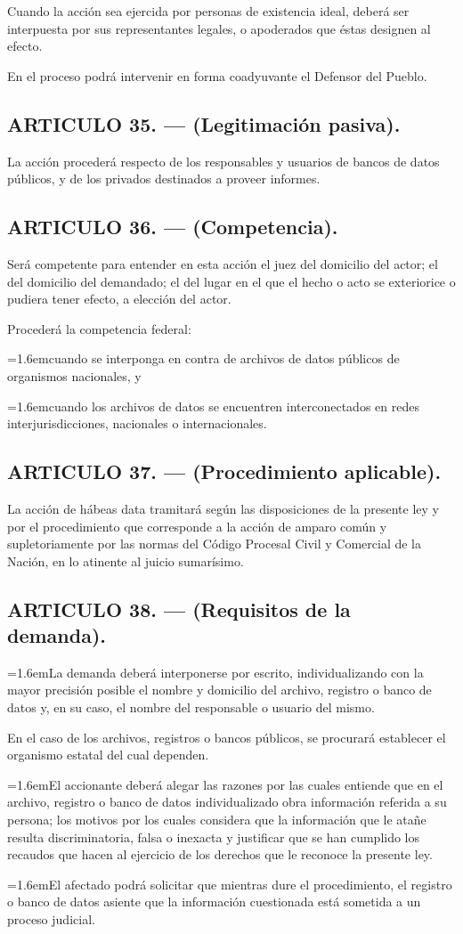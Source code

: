 \documentclass[10pt,a4paper]{article}
\newcommand{\articulo}[1]{\subsection{#1}}
\newcommand{\inciso}[2]{\par{\hangindent=1.6em\hangafter=1\makebox[1.6em][l]{#1}#2\par}}
\begin{document}
Cuando la acción sea ejercida por personas de existencia ideal, deberá ser interpuesta por sus representantes legales, o apoderados que éstas designen al efecto.

En el proceso podrá intervenir en forma coadyuvante el Defensor del Pueblo.

\articulo{ARTICULO 35. — (Legitimación pasiva).}
La acción procederá respecto de los responsables y usuarios de bancos de datos públicos, y de los privados destinados a proveer informes.

\articulo{ARTICULO 36. — (Competencia).}
Será competente para entender en esta acción el juez del domicilio del actor; el del domicilio del demandado; el del lugar en el que el hecho o acto se exteriorice o pudiera tener efecto, a elección del actor.

Procederá la competencia federal:

\inciso{a)}{cuando se interponga en contra de archivos de datos públicos de organismos nacionales, y}

\inciso{b)}{cuando los archivos de datos se encuentren interconectados en redes interjurisdicciones, nacionales o internacionales.}

\articulo{ARTICULO 37. — (Procedimiento aplicable).}
La acción de hábeas data tramitará según las disposiciones de la presente ley y por el procedimiento que corresponde a la acción de amparo común y supletoriamente por las normas del Código Procesal Civil y Comercial de la Nación, en lo atinente al juicio sumarísimo.

\articulo{ARTICULO 38. — (Requisitos de la demanda).}
\inciso{1.}{La demanda deberá interponerse por escrito, individualizando con la mayor precisión posible el nombre y domicilio del archivo, registro o banco de datos y, en su caso, el nombre del responsable o usuario del mismo.}

En el caso de los archivos, registros o bancos públicos, se procurará establecer el organismo estatal del cual dependen.

\inciso{2.}{El accionante deberá alegar las razones por las cuales entiende que en el archivo, registro o banco de datos individualizado obra información referida a su persona; los motivos por los cuales considera que la información que le atañe resulta discriminatoria, falsa o inexacta y justificar que se han cumplido los recaudos que hacen al ejercicio de los derechos que le reconoce la presente ley.}

\inciso{3.}{El afectado podrá solicitar que mientras dure el procedimiento, el registro o banco de datos asiente que la información cuestionada está sometida a un proceso judicial.}
\end{document}
